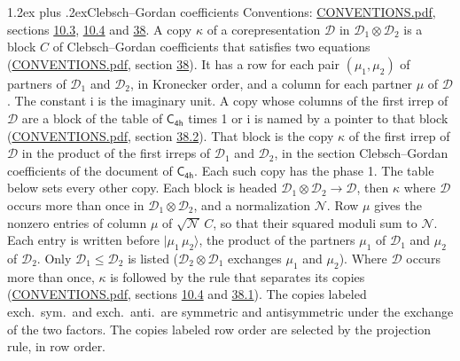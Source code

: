 \documentclass[10pt,a4paper]{article}
\makeatletter
\renewcommand\section{\@startsection{section}{1}{\z@}{-3ex plus -1ex minus -.2ex}%
  {1.2ex plus .2ex}{\normalfont\large\sffamily\bfseries\color{parttitle}}}
\numberwithin{equation}{section}
\newcommand{\grp}[1]{\mathsf{#1}}
\newcommand{\iunit}{\mathrm{i}}
\newcommand{\irrprod}{\otimes}
\newcommand{\mult}{\kappa}
\newcommand{\intx}{\mu}
\newcommand{\cgnorm}{\mathcal{N}}
\newcommand{\prodket}[2]{\lvert {#1}\,{#2}\rangle}
\makeatother
\begin{document}
\section{Clebsch--Gordan coefficients}\label{s:clebsch_gordan}
Conventions: \href{../../CONVENTIONS.pdf}{CONVENTIONS.pdf}, sections \href{../../../rotation/CONVENTIONS.pdf\#conv.10.3}{10.3}, \href{../../../rotation/CONVENTIONS.pdf\#conv.10.4}{10.4} and \href{../../CONVENTIONS.pdf\#conv.38}{38}.
\leavevmode\label{n:index.copy}\label{n:matrix.cg.stored}A copy $\mult$ of a corepresentation $\mathcal{D}$ in $\mathcal{D}_1\irrprod\mathcal{D}_2$ is a block $C$ of Clebsch--Gordan coefficients that satisfies two equations (\href{../../CONVENTIONS.pdf}{CONVENTIONS.pdf}, section \href{../../CONVENTIONS.pdf\#conv.38}{38}). \label{n:index.cg}It has a row for each pair $(\intx_1, \intx_2)$ of partners of $\mathcal{D}_1$ and $\mathcal{D}_2$, in Kronecker order, and a column for each partner $\intx$ of $\mathcal{D}$.
The constant $\iunit$ is the imaginary unit.
A copy whose columns of the first irrep of $\mathcal{D}$ are a block of the table of $\grp{C_{4h}}$ times 1 or $\iunit$ is named by a pointer to that block (\href{../../CONVENTIONS.pdf}{CONVENTIONS.pdf}, section \href{../../CONVENTIONS.pdf\#conv.38.2}{38.2}). That block is the copy $\mult$ of the first irrep of $\mathcal{D}$ in the product of the first irreps of $\mathcal{D}_1$ and $\mathcal{D}_2$, in the section Clebsch--Gordan coefficients of the document of \href{../../../rotation/data/pdf/C4h.pdf}{$\grp{C_{4h}}$}. Each such copy has the phase 1. The table below sets every other copy.
Each block is headed $\mathcal{D}_1\irrprod\mathcal{D}_2\to\mathcal{D}$, then $\mult$ where $\mathcal{D}$ occurs more than once in $\mathcal{D}_1\irrprod\mathcal{D}_2$, and a normalization $\cgnorm$. Row $\intx$ gives the nonzero entries of column $\intx$ of $\sqrt{\cgnorm}\,C$, so that their squared moduli sum to $\cgnorm$. \label{n:vector.ket.product}Each entry is written before $\prodket{\intx_1}{\intx_2}$, the product of the partners $\intx_1$ of $\mathcal{D}_1$ and $\intx_2$ of $\mathcal{D}_2$. Only $\mathcal{D}_1 \le \mathcal{D}_2$ is listed ($\mathcal{D}_2\irrprod\mathcal{D}_1$ exchanges $\intx_1$ and $\intx_2$).
Where $\mathcal{D}$ occurs more than once, $\mult$ is followed by the rule that separates its copies (\href{../../CONVENTIONS.pdf}{CONVENTIONS.pdf}, sections \href{../../../rotation/CONVENTIONS.pdf\#conv.10.4}{10.4} and \href{../../CONVENTIONS.pdf\#conv.38.1}{38.1}). \label{n:abbreviation.exchange}The copies labeled exch.\ sym.\ and exch.\ anti.\ are symmetric and antisymmetric under the exchange of the two factors. The copies labeled row order are selected by the projection rule, in row order.
\end{document}
